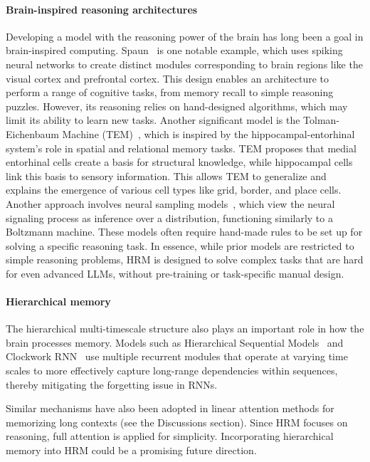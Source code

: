 \paragraph{Brain-inspired reasoning architectures}

Developing a model with the reasoning power of the brain has long been a goal in brain-inspired computing.
Spaun~\citep{spaun} is one notable example, which uses spiking neural networks to create distinct modules corresponding to brain regions like the visual cortex and prefrontal cortex. This design enables an architecture to perform a range of cognitive tasks, from memory recall to simple reasoning puzzles. However, its reasoning relies on hand-designed algorithms, which may limit its ability to learn new tasks.
Another significant model is the Tolman-Eichenbaum Machine (TEM)~\citep{TEM}, which is inspired by the hippocampal-entorhinal system's role in spatial and relational memory tasks. TEM proposes that medial entorhinal cells create a basis for structural knowledge, while hippocampal cells link this basis to sensory information. This allows TEM to generalize and explains the emergence of various cell types like grid, border, and place cells. 
Another approach involves neural sampling models~\citep{buesing2011neural}, which view the neural signaling process as inference over a distribution, functioning similarly to a Boltzmann machine. These models often require hand-made rules to be set up for solving a specific reasoning task.
In essence, while prior models are restricted to simple reasoning problems, HRM is designed to solve complex tasks that are hard for even advanced LLMs, without pre-training or task-specific manual design.

\paragraph{Hierarchical memory}

The hierarchical multi-timescale structure also plays an important role in how the brain processes memory. Models such as Hierarchical Sequential Models~\cite{NIPS1995_c667d53a} and Clockwork RNN~\cite{Koutnk2014ACR} use multiple recurrent modules that operate at varying time scales to more effectively capture long-range dependencies within sequences, thereby mitigating the forgetting issue in RNNs. 

Similar mechanisms have also been adopted in linear attention methods for memorizing long contexts (see the Discussions section). 
Since HRM focuses on reasoning, full attention is applied for simplicity. Incorporating hierarchical memory into HRM could be a promising future direction.
